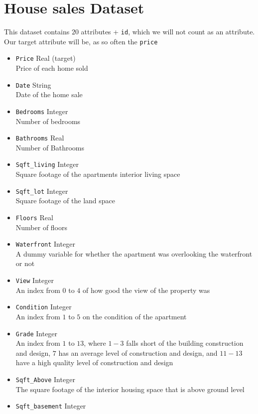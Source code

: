 \documentclass[11pt]{article}
\begin{document}
\newpage
\section{House sales Dataset}
This dataset contains $20$ attributes + \texttt{id}, which we will not count as an attribute. Our target attribute will be, as so often the \texttt{price}
\begin{multicols}{2}
\begin{itemize}
\item \texttt{Price} Real (target) \\
Price of each home sold
\item \texttt{Date} String\\
Date of the home sale 
\item \texttt{Bedrooms} Integer\\
Number of bedrooms
\item \texttt{Bathrooms} Real\\
Number of Bathrooms
\item \texttt{Sqft\_living} Integer\\
Square footage of the apartments interior living space
\item \texttt{Sqft\_lot} Integer\\
Square footage of the land space
\item \texttt{Floors} Real\\
Number of floors
\item \texttt{Waterfront} Integer\\
A dummy variable for whether the apartment was overlooking the waterfront or not
\item \texttt{View} Integer\\
An index from $0$ to $4$ of how good the view of the property was
\item \texttt{Condition} Integer\\
An index from $1$ to $5$ on the condition of the apartment
\columnbreak
\item \texttt{Grade} Integer\\
An index from $1$ to $13$, where $1-3$ falls short of the building construction and design, $7$ has an average level of construction and design, and $11-13$ have a high quality level of construction and design
\item \texttt{Sqft\_Above} Integer\\
The square footage of the interior housing space that is above ground level
\item \texttt{Sqft\_basement} Integer\\

\end{itemize}
\end{multicols}
\end{document}
